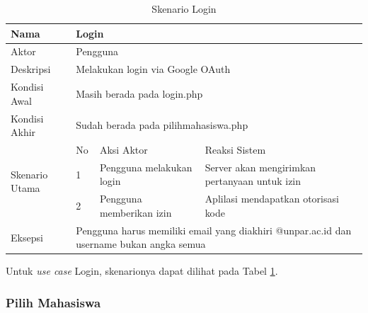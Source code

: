 \begin{table}
\centering
\caption[Tabel Skenario Login]{Skenario Login}
\label{tab:skenariologin}
\begin{tabular}{|p{1.4cm}|p{0.4cm}|p{2cm}|p{2cm}|p{2cm}|p{2cm}|}
\hline
Nama & \multicolumn{5}{p{8cm}|}{Login} \\ \hline
Aktor & \multicolumn{5}{p{8cm}|}{Pengguna} \\ \hline
Deskripsi & \multicolumn{5}{p{8cm}|}{Melakukan login via Google OAuth} \\ \hline
Kondisi Awal & \multicolumn{5}{p{8cm}|}{Masih berada pada login.php} \\ \hline
Kondisi Akhir & \multicolumn{5}{p{8cm}|}{Sudah berada pada pilihmahasiswa.php}
\\ \hline
\multirow{3}{*}{\parbox{1.4cm}{Skenario Utama}} & No &
\multicolumn{2}{p{4cm}|}{Aksi Aktor} & \multicolumn{2}{p{4cm}|}{Reaksi Sistem}
\\ \cline{2-6}
& 1 & \multicolumn{2}{p{4cm}|}{Pengguna melakukan login} &
\multicolumn{2}{p{4cm}|}{Server akan mengirimkan pertanyaan untuk izin} \\
\cline{2-6} & 2 & \multicolumn{2}{p{4cm}|}{Pengguna memberikan izin} &
\multicolumn{2}{p{4cm}|}{Aplilasi mendapatkan otorisasi kode} \\ \hline
Eksepsi & \multicolumn{5}{p{8cm}|}{Pengguna harus memiliki email yang diakhiri
@unpar.ac.id dan username bukan angka semua} \\ \hline
\end{tabular}
\end{table}

Untuk {\it use case} Login, skenarionya dapat dilihat pada Tabel
\ref{tab:skenariologin}.

\subsubsection{Pilih Mahasiswa}

